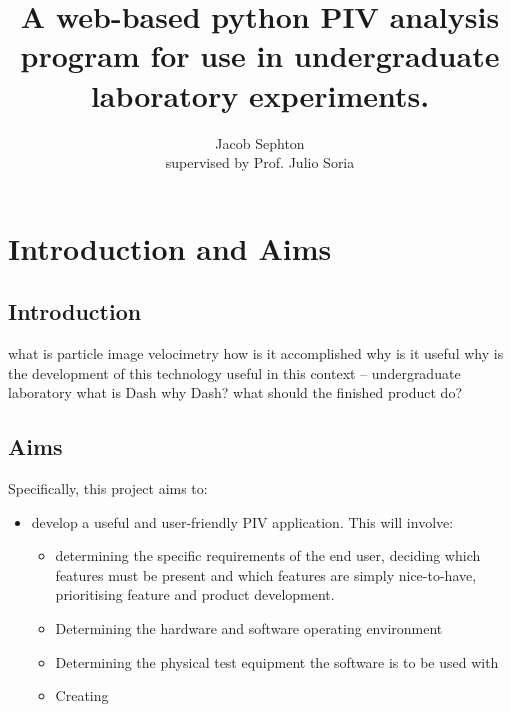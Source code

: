 \documentclass[12pt, a4paper]{amsart}
\title{A web-based python PIV analysis program for use in undergraduate laboratory experiments.}
\author{Jacob Sephton\\ supervised by Prof. Julio Soria}
\begin{document}
\maketitle

\section{Introduction and Aims}
\subsection{Introduction}
what is particle image velocimetry
how is it accomplished
why is it useful
why is the development of this technology useful in this context -- undergraduate laboratory
what is Dash
why Dash?
what should the finished product do?

\subsection{Aims}
Specifically, this project aims to:
\begin{itemize}
\item develop a useful and user-friendly PIV application. This will involve: 
\begin{itemize}
	\item determining the specific requirements of the end user, deciding which features must be present and which features are simply nice-to-have, prioritising feature and product development.
	\item Determining the hardware and software operating environment
	\item Determining the physical test equipment the software is to be used with
	\item Creating 
\end{itemize}
\end{itemize}
\end{document}

